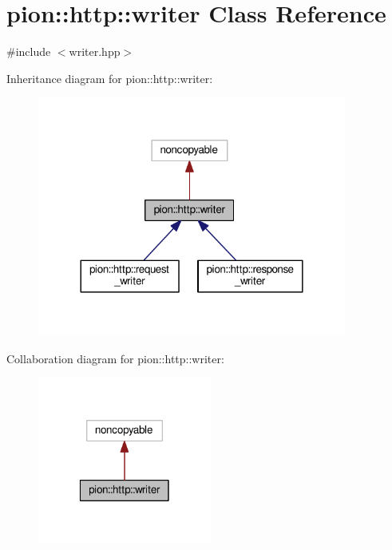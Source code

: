 \hypertarget{classpion_1_1http_1_1writer}{\section{pion\-:\-:http\-:\-:writer Class Reference}
\label{classpion_1_1http_1_1writer}
}


{\ttfamily \#include $<$writer.\-hpp$>$}



Inheritance diagram for pion\-:\-:http\-:\-:writer\-:
\nopagebreak
\begin{figure}[H]
\begin{center}
\leavevmode
\includegraphics[width=288pt]{classpion_1_1http_1_1writer__inherit__graph}
\end{center}
\end{figure}


Collaboration diagram for pion\-:\-:http\-:\-:writer\-:
\nopagebreak
\begin{figure}[H]
\begin{center}
\leavevmode
\includegraphics[width=162pt]{classpion_1_1http_1_1writer__coll__graph}
\end{center}
\end{figure}
